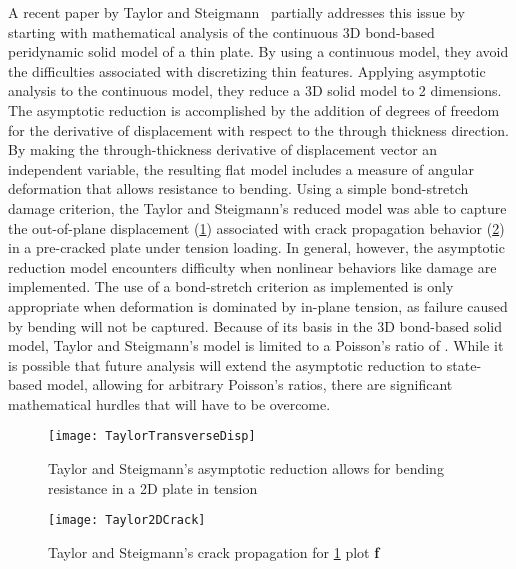A recent paper by Taylor and Steigmann~\cite{taylor2013two} partially addresses this issue by starting with mathematical analysis of the continuous 3D bond-based peridynamic solid model of a thin plate.
By using a continuous model, they avoid the difficulties associated with discretizing thin features.
Applying asymptotic analysis to the continuous model, they reduce a 3D solid model to 2 dimensions.
The asymptotic reduction is accomplished by the addition of degrees of freedom for the derivative of displacement with respect to the through thickness direction.
By making the through-thickness derivative of displacement vector an independent variable, the resulting flat model includes a measure of angular deformation that allows resistance to bending.
Using a simple bond-stretch damage criterion, the Taylor and Steigmann's reduced model was able to capture the out-of-plane displacement (\cref{fig:TaylorTransverse}) associated with crack propagation behavior (\cref{fig:TaylorCrack}) in a pre-cracked plate under tension loading.
In general, however, the asymptotic reduction model encounters difficulty when nonlinear behaviors like damage are implemented.
The use of a bond-stretch criterion as implemented is only appropriate when deformation is dominated by in-plane tension, as failure caused by bending will not be captured.
Because of its basis in the 3D bond-based solid model, Taylor and Steigmann's model is limited to a Poisson's ratio of .
While it is possible that future analysis will extend the asymptotic reduction to state-based model, allowing for arbitrary Poisson's ratios, there are significant mathematical hurdles that will have to be overcome.

%
\begin{figure}[h!]
  \centering
\texttt{[image: TaylorTransverseDisp]}
\caption[Taylor and Steigmann plate transverse displacement]{Taylor and Steigmann's asymptotic reduction allows for bending resistance in a 2D plate in tension~\cite{taylor2013two}}
\label{fig:TaylorTransverse}
\end{figure}
%
%
\begin{figure}[h!]
  \centering
\texttt{[image: Taylor2DCrack]}
\caption[Taylor and Steigmann plate cracking]{Taylor and Steigmann's crack propagation for \cref{fig:TaylorTransverse} plot \textbf{f}~\cite{taylor2013two}}
\label{fig:TaylorCrack}
\end{figure}
%


